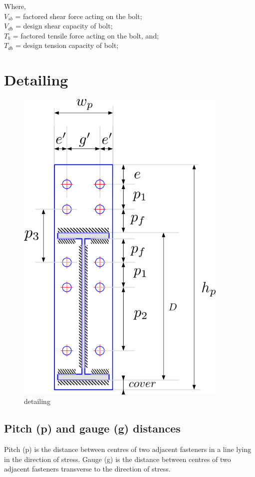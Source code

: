 \documentclass[11.5pt,a4paper,oneside]{report}
\newcommand{\okornot}{ \vspace{15mm} \hrule
	\noindent \\ \\
	Is this check \qquad
	\CheckBox[checked=False, name= ok]{\textbf{Ok}} \qquad / 
	\CheckBox[checked=False, name= notok]{\textbf{Not Ok}}\\ \\
	Comments \\ \\
	\noindent
	\TextField[name=multilinetextbox, multiline=true, width=1.0\linewidth,height=2in]{}}
\begin{document}
\begin{Form}
Where, \\
\indent $V_{sb}$ = factored shear force acting on the bolt; \\
\indent $V_{db}$ = design shear capacity of bolt; \\
\indent $T_b$ = factored tensile force acting on the bolt, and; \\
\indent $T_{db}$ = design tension capacity of bolt; \\



	
\chapter{Detailing}
	\begin{figure}[h]
		\centering
		\includegraphics[width=4in]{detailing.png}
		\caption{detailing}
	\end{figure}

\section{Pitch (p) and gauge (g) distances}
	Pitch (p) is the distance between centres of two adjacent fasteners in a line lying in the direction of stress.
	Gauge (g) is the distance between centres of two adjacent fasteners transverse to the direction of stress.


\end{Form}
\end{document}
